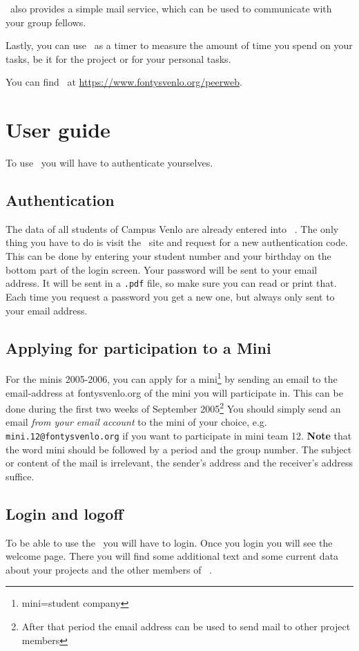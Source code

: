 \peerweb\  also provides a simple mail service, which can be used to
communicate with your group fellows. 

Lastly, you can use \peerweb\  as a
timer to measure the amount of time you spend on your tasks, be it for
the project or for your personal tasks.

You can find \peerweb\  at \url{https://www.fontysvenlo.org/peerweb}.

\section{User guide}
To use \peerweb\  you will have to authenticate yourselves.

\subsection{Authentication}
The data of all students of Campus Venlo are already entered into
\peerweb\ .
The only thing you have to do is visit the \peerweb\  site and request
for a new authentication code. This can be done by entering your
student number and your birthday on the bottom part of the login
screen. Your password will be sent to your \Fontys email
address. It will be sent in a \texttt{.pdf} file, so make sure you can read or
print that. Each time you request a password you get a new one, but
always only sent to your \Fontys email address.

\subsection{Applying for participation to a Mini}
For the minis 2005-2006, you can apply for a
mini\footnote{mini=student company} by sending an email
to the email-address at fontysvenlo.org of the mini you will
participate in. This can be done 
during the first two weeks of September 2005\footnote{After that
period the email address can be used to send mail to other project members}
You should simply send an email \textit{from your \Fontys email
account} to the mini of your choice,
e.g. \verb#mini.12@fontysvenlo.org# if you want to participate in
mini team 12. \textbf{Note} that the word mini should be followed by a
period and the group number. The subject or content of the mail is
irrelevant, the sender's address and the receiver's address suffice.

\subsection{Login and logoff}
To be able to use the \peerweb\  you will have to login. Once you login
you will see the welcome page. There you will find some additional
text and some current data about your projects and the other members
of \peerweb\ . 

